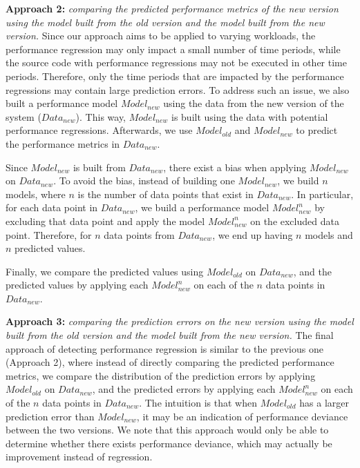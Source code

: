 \noindent\textbf{Approach 2: }\emph{comparing the predicted performance metrics of the new version using the model built from the old version and the model built from the new version.} %
Since our approach aims to be applied to varying workloads, the performance regression may only impact a small number of time periods, while the source code with performance regressions may not be executed in other time periods. Therefore, only the time periods that are impacted by the performance regressions may contain large prediction errors. To address such an issue, we also built a performance model $Model_{new}$ using the data from the new version of the system ($Data_{new}$). 
This way, $Model_{new}$ is built using the data with potential performance regressions. 
Afterwards, we use $Model_{old}$ and $Model_{new}$ to predict the performance metrics in $Data_{new}$. 

Since $Model_{new}$ is built from $Data_{new}$, there exist a bias when applying $Model_{new}$ on $Data_{new}$. To avoid the bias, instead of building one $Model_{new}$, we build $n$ models, where $n$ is the number of data points that exist in $Data_{new}$. In particular, for each data point in $Data_{new}$, we build a performance model $Model_{new}^n$ by excluding that data point and apply the model $Model_{new}^n$ on the excluded data point. Therefore, for $n$ data points from $Data_{new}$, we end up having $n$ models and $n$ predicted values. 

Finally, we compare the predicted values using $Model_{old}$ on $Data_{new}$, and the predicted values by applying each $Model_{new}^n$ on each of the $n$ data points in $Data_{new}$.


\noindent\textbf{Approach 3: }\emph{comparing the prediction errors on the new version using the model built from the old version and the model built from the new version.}
The final approach of detecting performance regression is similar to the previous one (Approach 2), where instead of directly comparing the predicted performance metrics, we compare the distribution of the prediction errors by applying $Model_{old}$ on $Data_{new}$, and the predicted errors by applying each $Model_{new}^n$ on each of the $n$ data points in $Data_{new}$. The intuition is that when $Model_{old}$ has a larger prediction error than $Model_{new}$, it may be an indication of performance deviance between the two versions. We note that this approach would only be able to determine whether there exists performance deviance, which may actually be improvement instead of regression. 


